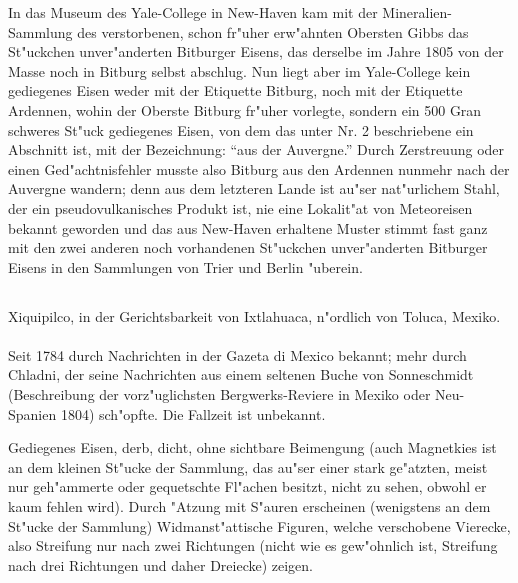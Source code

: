 \documentclass[a4paper, 11pt, oneside, polutonikogreek, german]{article}
\begin{document}
\setlength{\leftskip}{10mm}
\setlength{\parindent}{0pt}

{\footnotesize In das Museum des Yale-College in New-Haven kam mit der Mineralien-Sammlung des verstorbenen, schon fr"uher erw"ahnten Obersten Gibbs das St"uckchen unver"anderten Bitburger Eisens, das derselbe im Jahre 1805 von der Masse noch in Bitburg selbst abschlug. Nun liegt aber im Yale-College kein gediegenes Eisen weder mit der Etiquette Bitburg, noch mit der Etiquette Ardennen, wohin der Oberste Bitburg fr"uher vorlegte, sondern ein 500 Gran schweres St"uck gediegenes Eisen, von dem das unter Nr. 2 beschriebene ein Abschnitt ist, mit der Bezeichnung: "`aus der Auvergne."' Durch Zerstreuung oder einen Ged"achtnisfehler musste also Bitburg aus den Ardennen nunmehr nach der Auvergne wandern; denn aus dem letzteren Lande ist au"ser nat"urlichem Stahl, der ein pseudovulkanisches Produkt ist, nie eine Lokalit"at von Meteoreisen bekannt geworden und das aus New-Haven erhaltene Muster stimmt fast ganz mit den zwei anderen noch vorhandenen St"uckchen unver"anderten Bitburger Eisens in den Sammlungen von Trier und Berlin "uberein.}

\setlength{\leftskip}{0pt}
\setlength{\parindent}{20pt}

\subsection{}
\begin{center}

Xiquipilco, in der Gerichtsbarkeit von Ixtlahuaca, n"ordlich von Toluca, Mexiko.
\end{center}
\paragraph{}
Seit 1784 durch Nachrichten in der Gazeta di Mexico bekannt; mehr durch Chladni, der seine Nachrichten aus einem seltenen Buche von Sonneschmidt (Beschreibung der vorz"uglichsten Bergwerks-Reviere in Mexiko oder Neu-Spanien 1804) sch"opfte. Die Fallzeit ist unbekannt.

Gediegenes Eisen, derb, dicht, ohne sichtbare Beimengung (auch Magnetkies ist an dem kleinen St"ucke der Sammlung, das au"ser einer stark ge"atzten, meist nur geh"ammerte oder gequetschte Fl"achen besitzt, nicht zu sehen, obwohl er kaum fehlen wird). Durch "Atzung mit S"auren erscheinen (wenigstens an dem St"ucke der Sammlung) Widmanst"attische Figuren, welche verschobene Vierecke, also Streifung nur nach zwei Richtungen (nicht wie es gew"ohnlich ist, Streifung nach drei Richtungen und daher Dreiecke) zeigen.
\end{document}
